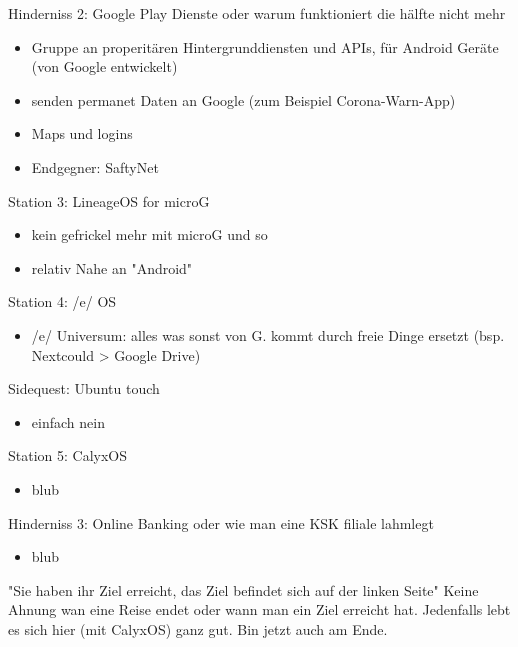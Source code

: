 \documentclass[14pt,compress,usenames,dvipsnames,aspectratio=169]{beamer}
\begin{document}
\begin{frame}{Hinderniss 2: Google Play Dienste}
    oder warum funktioniert die hälfte nicht mehr
    \begin{itemize}
        \item Gruppe an properitären Hintergrunddiensten und APIs, für Android Geräte (von Google entwickelt)
        \item senden permanet Daten an Google (zum Beispiel Corona-Warn-App)
        \item Maps und logins 
        \item Endgegner: SaftyNet
    \end{itemize}
\end{frame}

\begin{frame}{Station 3: LineageOS for microG}
    \begin{itemize}
        \item kein gefrickel mehr mit microG und so 
        \item relativ Nahe an "Android"
    \end{itemize}
\end{frame}

\begin{frame}{Station 4: /e/ OS}
    \begin{itemize}
        \item /e/ Universum: alles was sonst von G. kommt durch freie Dinge ersetzt (bsp. Nextcould > Google Drive)
    \end{itemize}
\end{frame}

\begin{frame}{Sidequest: Ubuntu touch}
    \begin{itemize}
        \item einfach nein
    \end{itemize}
\end{frame}

\begin{frame}{Station 5: CalyxOS}
    \begin{itemize}
        \item blub
    \end{itemize}
\end{frame}

\begin{frame}{Hinderniss 3: Online Banking}
    oder wie man eine KSK filiale lahmlegt
    \begin{itemize}
        \item blub
    \end{itemize}
\end{frame}

\begin{frame}{"Sie haben ihr Ziel erreicht, das Ziel befindet sich auf der linken Seite"}
    Keine Ahnung wan eine Reise endet oder wann man ein Ziel erreicht hat. 
    Jedenfalls lebt es sich hier (mit CalyxOS) ganz gut.
    Bin jetzt auch am Ende.
\end{frame}
\end{document}
